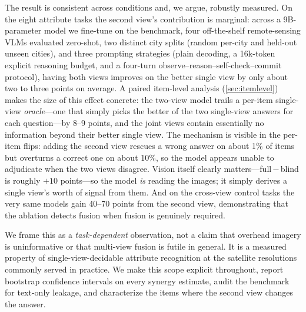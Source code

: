 \documentclass[runningheads]{llncs}
\begin{document}
The result is consistent across conditions and, we argue, robustly measured.
On the eight attribute tasks the second view's contribution is marginal: across a
\num{9}B-parameter model we fine-tune on the benchmark, four off-the-shelf
remote-sensing VLMs evaluated zero-shot, two distinct city splits (random
per-city and held-out unseen cities), and three prompting strategies (plain
decoding, a \num{16}k-token explicit reasoning budget, and a four-turn
observe--reason--self-check--commit protocol), having both views improves on the
better single view by only about two to three points on average. A paired
item-level analysis (\cref{sec:itemlevel}) makes the size of this effect concrete:
the two-view model trails a per-item single-view \emph{oracle}---one that simply
picks the better of the two single-view answers for each question---by
\num{8}--\num{9} points, and the joint views contain essentially no information
beyond their better single view. The mechanism is visible in the per-item flips:
adding the second view rescues a wrong answer on about \num{1}\% of items but
overturns a correct one on about \num{10}\%, so the model appears unable to
adjudicate when the two views disagree. Vision itself clearly
matters---\textsf{full}\,$-$\,\textsf{blind} is roughly $+\num{10}$ points---so
the model \emph{is} reading the images; it simply derives a single view's worth of
signal from them. And on the cross-view control tasks the very same models gain
\num{40}--\num{70} points from the second view, demonstrating that the ablation
detects fusion when fusion is genuinely required.

We frame this as a \emph{task-dependent} observation, not a claim that overhead
imagery is uninformative or that multi-view fusion is futile in general. It is a
measured property of single-view-decidable attribute recognition at the satellite
resolutions commonly served in practice. We make this scope explicit throughout,
report bootstrap confidence intervals on every synergy estimate, audit the
benchmark for text-only leakage, and characterize the items where the second view
changes the answer.
\end{document}
